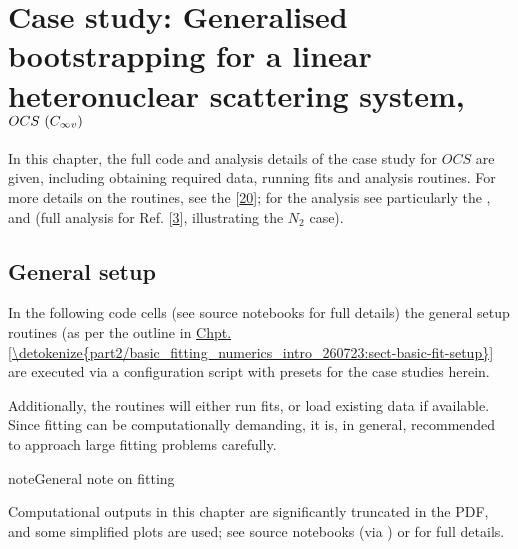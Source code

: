 \documentclass[letterpaper,table,10pt,english]{jupyterBook}
\begin{document}
\chapter{Case study: Generalised bootstrapping for a linear heteronuclear scattering system, \protect\(OCS~(C_{\infty v})\protect\)}
\label{\detokenize{part2/case-study-OCS_290723:case-study-generalised-bootstrapping-for-a-linear-heteronuclear-scattering-system-ocs-c-infty-v}}\label{\detokenize{part2/case-study-OCS_290723:chpt-ocs-case-study}}\label{\detokenize{part2/case-study-OCS_290723::doc}}
\sphinxAtStartPar
In this chapter, the full code and analysis details of the case study for \(OCS\) are given, including obtaining required data, running fits and analysis routines. For more details on the routines, see the  {[}\hyperlink{cite.backmatter/bibliography:id679}{20}{]}; for the analysis see particularly the , and  (full analysis for Ref. {[}\hyperlink{cite.backmatter/bibliography:id684}{3}{]}, illustrating the \(N_2\) case).


\section{General setup}
\label{\detokenize{part2/case-study-OCS_290723:general-setup}}
\sphinxAtStartPar
In the following code cells (see source notebooks for full details) the general setup routines (as per the outline in \hyperref[\detokenize{part2/basic_fitting_numerics_intro_260723:sect-basic-fit-setup}]{Chpt.\@ \ref{\detokenize{part2/basic_fitting_numerics_intro_260723:sect-basic-fit-setup}}} are executed via a configuration script with presets for the case studies herein.

\sphinxAtStartPar
Additionally, the routines will either run fits, or load existing data if available. Since fitting can be computationally demanding, it is, in general, recommended to approach large fitting problems carefully.

\begin{sphinxShadowBox}
\sphinxstylesidebartitle{}

\begin{sphinxadmonition}{note}{General note on fitting}

\sphinxAtStartPar
Computational outputs in this chapter are significantly truncated in the PDF, and some simplified plots are used; see source notebooks (via ) or  for full details.
\end{sphinxadmonition}
\end{sphinxShadowBox}
\end{document}
